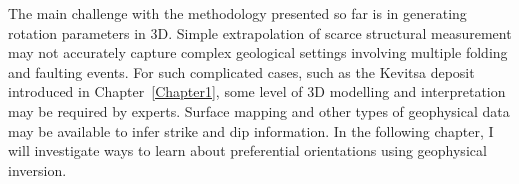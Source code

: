 The main challenge with the methodology presented so far is in generating rotation parameters in 3D. Simple extrapolation of scarce structural measurement may not accurately capture complex geological settings involving multiple folding and faulting events. For such complicated cases, such as the Kevitsa deposit introduced in Chapter~\ref{Chapter1}, some level of 3D modelling and interpretation may be required by experts. Surface mapping and other types of geophysical data may be available to infer strike and dip information. In the following chapter, I will investigate ways to learn about preferential orientations using geophysical inversion.


\endinput